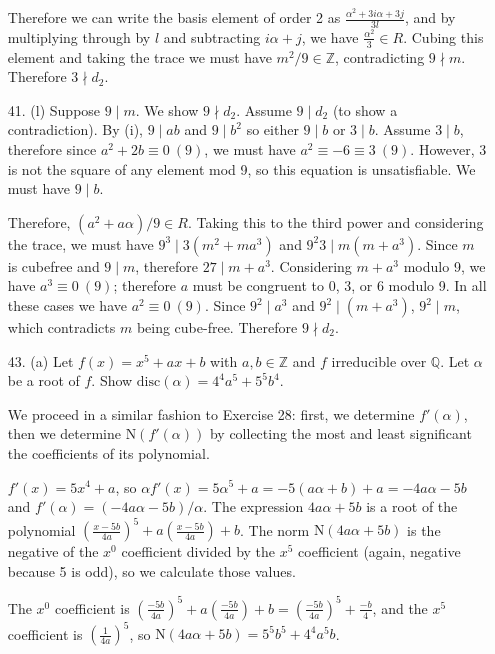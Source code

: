 \documentclass{article}
\newcommand{\Q}[0]{\mathbb{Q}}
\newcommand{\Z}[0]{\mathbb{Z}}
\newcommand{\norm}[1]{\text{N}(#1)}
\newcommand{\disc}[1]{\text{disc}(#1)}
\newcommand{\modequiv}[3]{#1 \equiv #2\ (#3)}
\begin{document}
\begin{enumerate}
Therefore we can write the basis element of order 2 as $\frac{\alpha^2 + 3i\alpha + 3j}{3l}$, and by multiplying through by $l$ and subtracting $i\alpha + j$, we have $\frac{\alpha^2}{3} \in R$.  Cubing this element and taking the trace we must have $m^2  / 9 \in \Z$, contradicting $9 \nmid m$.  Therefore $3 \nmid d_2$.

\item[41. (l)]  Suppose $9 \mid m$.  We show $9 \nmid d_2$.  Assume $9 \mid d_2$ (to show a contradiction).  By (i), $9 \mid ab$ and $9 \mid b^2$ so either $9 \mid b$ or $3 \mid b$.  Assume $3 \mid b$, therefore since $\modequiv{a^2 + 2b}{0}{9}$, we must have $\modequiv{a^2}{-6 \equiv 3}{9}$.  However, 3 is not the square of any element mod 9, so this equation is unsatisfiable.  We must have $9 \mid b$.

Therefore, $(a^2 + a\alpha) / 9 \in R$.  Taking this to the third power and considering the trace, we must have $9^3 \mid 3(m^2 + ma^3)$ and $9^2 3 \mid m(m + a^3)$.  Since $m$ is cubefree and $9 \mid m$, therefore $27 \mid m + a^3$.  Considering $m + a^3$ modulo 9, we have $\modequiv{a^3}{0}{9}$; therefore $a$ must be congruent to 0, 3, or 6 modulo 9.  In all these cases we have $\modequiv{a^2}{0}{9}$.  Since $9^2 \mid a^3$ and $9^2 \mid (m + a^3)$, $9^2 \mid m$, which contradicts $m$ being cube-free.  Therefore $9 \nmid d_2$.

\item[43. (a)] Let $f(x) = x^5 + ax + b$ with $a, b \in \Z$ and $f$ irreducible over $\Q$.  Let $\alpha$ be a root of $f$.  Show $\disc{\alpha} = 4^4 a^5 + 5^5 b^4$.

We proceed in a similar fashion to Exercise 28: first, we determine $f'(\alpha)$, then we determine $\norm{f'(\alpha)}$ by collecting the most and least significant the coefficients of its polynomial.

$f'(x) = 5x^4 + a$, so $\alpha f'(x) = 5\alpha^5 + a = -5(a\alpha + b) + a = -4a \alpha - 5b$ and $f'(\alpha) = (-4a\alpha - 5b) / \alpha$.  The expression $4a\alpha + 5b$ is a root of the polynomial $(\frac{x - 5b}{4a})^5 + a(\frac{x - 5b}{4a}) + b$.  The norm $\norm{4a\alpha + 5b}$ is the negative of the $x^0$ coefficient divided by the $x^5$ coefficient (again, negative because 5 is odd), so we calculate those values.

The $x^0$ coefficient is $(\frac{-5b}{4a})^5 + a(\frac{-5b}{4a}) + b = (\frac{-5b}{4a})^5 + \frac{-b}{4}$, and the $x^5$ coefficient is $(\frac{1}{4a})^5$, so $\norm{4a\alpha + 5b} = 5^5 b^5 + 4^4 a^5 b$.


\end{enumerate}
\end{document}
